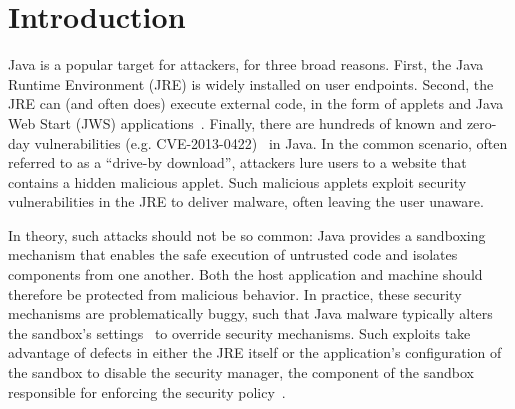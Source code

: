 \documentclass{sig-alternate}
\begin{document}
\section{Introduction}

Java is a popular target for attackers,
for three broad reasons. First, the Java Runtime Environment (JRE) is widely installed on user endpoints.
Second, the JRE can (and often does) execute external code, in the form of
applets and Java Web Start (JWS) %
applications~\cite{gong1997going,gong2003inside}. Finally, there are hundreds
of known and zero-day vulnerabilities (e.g. CVE-2013-0422)~\cite{xforceQ12013}
in Java. In the
common scenario, often referred to as a ``drive-by download'', attackers lure
users to a website that contains a hidden malicious applet. Such malicious
applets exploit security vulnerabilities in the JRE to deliver malware,
often leaving the user unaware.


In theory, such attacks should not be so common:
Java provides a sandboxing mechanism that enables the safe execution of untrusted code and isolates
components from one another. Both the host application and machine should
therefore be protected from malicious behavior.
In practice, these security mechanisms are problematically
buggy, such that Java malware typically alters the sandbox's
settings~\cite{garber_2012} to override security mechanisms. Such exploits take advantage of defects in either
the JRE itself or the application's configuration of the sandbox to
disable the security manager, the component of the sandbox responsible for enforcing the
security policy~\cite{fireeye_2013,svoboda_anatomy_blog_2013,security_explorations_2012,blackhat_2012}.
\end{document}

